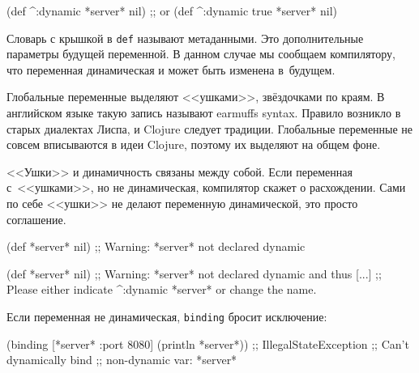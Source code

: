 \begin{english}
  \begin{clojure}
(def ^:dynamic *server* nil)
;; or
(def ^{:dynamic true} *server* nil)
  \end{clojure}
\end{english}

Словарь с крышкой в \verb|def| называют метаданными. Это дополнительные
параметры будущей переменной. В данном случае мы сообщаем компилятору, что
переменная динамическая и может быть изменена в~будущем.

Глобальные переменные выделяют <<ушками>>, звёздочками по краям. В английском
языке такую запись называют earmuffs syntax. Правило возникло в старых
диалектах Лиспа, и Clojure следует традиции. Глобальные переменные не совсем
вписываются в идеи Clojure, поэтому их выделяют на общем фоне.


<<Ушки>> и динамичность связаны между собой. Если переменная с~<<ушками>>, но не
динамическая, компилятор скажет о расхождении. Сами по себе <<ушки>> не делают
переменную динамической, это просто соглашение.

\ifx\DEVICETYPE\MOBILE

\begin{english}
  \begin{clojure}
(def *server* nil)
;; Warning: *server* not declared dynamic
  \end{clojure}
\end{english}

\else

\begin{english}
  \begin{clojure}
(def *server* nil)
;; Warning: *server* not declared dynamic and thus [...]
;; Please either indicate ^:dynamic *server* or change the name.
  \end{clojure}
\end{english}

\fi

\noindent
Если переменная не динамическая, \verb|binding| бросит исключение:

\ifx\DEVICETYPE\MOBILE

\begin{english}
  \begin{clojure}
(binding [*server* {:port 8080}]
  (println *server*))
;; IllegalStateException
;; Can't dynamically bind
;; non-dynamic var: *server*
  \end{clojure}
\end{english}

